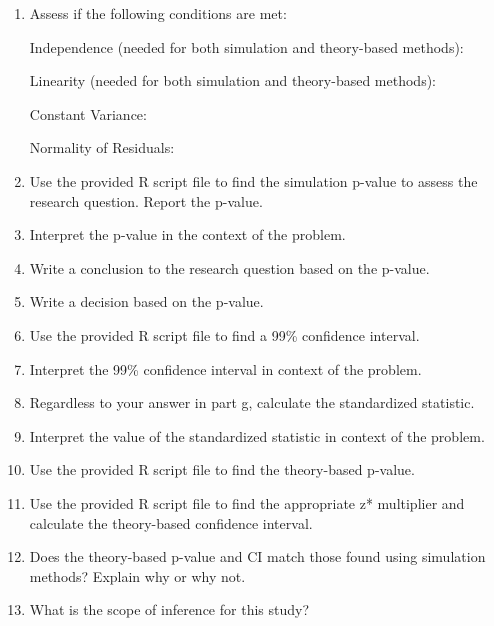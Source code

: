 \documentclass[
]{report}
\begin{document}
\begin{enumerate}
\def\labelenumi{\alph{enumi}.}
\setcounter{enumi}{5}
\item
  Assess if the following conditions are met:

  Independence (needed for both simulation and theory-based methods):
  \vspace{0.8in}

  Linearity (needed for both simulation and theory-based methods):
  \vspace{0.8in}

  Constant Variance:
  \vspace{0.8in}

  Normality of Residuals:
  \vspace{0.8in}
\item
  Use the provided R script file to find the simulation p-value to assess the research question. Report the p-value.
  \vspace{0.3in}
\item
  Interpret the p-value in the context of the problem.
  \vspace{0.8in}
\item
  Write a conclusion to the research question based on the p-value.
  \vspace{0.8in}
\item
  Write a decision based on the p-value.
  \vspace{0.3in}
\item
  Use the provided R script file to find a 99\% confidence interval.
  \vspace{0.3in}
\item
  Interpret the 99\% confidence interval in context of the problem.
  \vspace{0.8in}
\item
  Regardless to your answer in part g, calculate the standardized statistic.
  \vspace{0.4in}
\item
  Interpret the value of the standardized statistic in context of the problem.
  \vspace{0.8in}
\item
  Use the provided R script file to find the theory-based p-value.
  \vspace{0.3in}
\item
  Use the provided R script file to find the appropriate z* multiplier and calculate the theory-based confidence interval.
  \vspace{0.5in}
\item
  Does the theory-based p-value and CI match those found using simulation methods? Explain why or why not.
  \vspace{0.8in}
\item
  What is the scope of inference for this study?
  \vspace{0.8in}
\end{enumerate}
\end{document}
